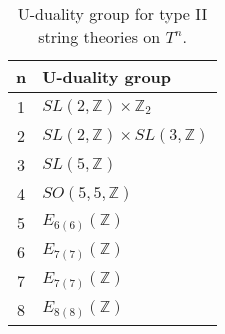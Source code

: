 \begin{table}\centering
    \caption{U-duality group for type II string theories on $T^n$.}\label{tab:UdualityString}
    \begin{tabular}{|c|l|}\hline
        n & U-duality group \\\hline
        1 & $SL(2,\mathbb{Z})\times\mathbb{Z}_2$\\
        2 & $SL(2,\mathbb{Z})\times SL(3,\mathbb{Z})$\\
        3 & $SL(5,\mathbb{Z})$\\
        4 & $SO(5,5,\mathbb{Z})$\\
        5 & $E_{6(6)}(\mathbb{Z})$\\
        6 & $E_{7(7)}(\mathbb{Z})$\\
        7 & $E_{7(7)}(\mathbb{Z})$\\
        8 & $E_{8(8)}(\mathbb{Z})$\\\hline
    \end{tabular}
\end{table}


